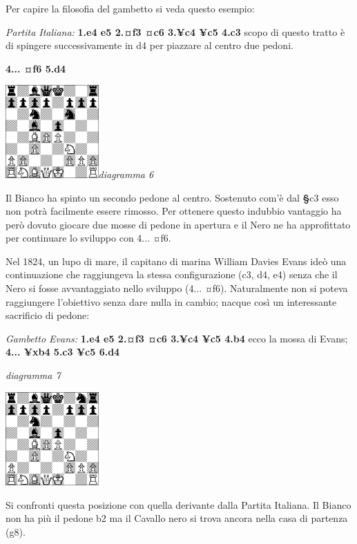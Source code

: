 \documentclass[
]{article}
\begin{document}
Per capire la filosofia del gambetto si veda questo esempio:

\emph{Partita Italiana:} \textbf{1.e4 e5 2.¤f3 ¤c6 3.¥c4 ¥c5 4.c3} scopo
di questo tratto è di spingere successivamente in d4 per piazzare al
centro due pedoni.

\textbf{4... ¤f6 5.d4}

\includegraphics[width=1.40139in,height=1.40139in]{vertopal_109f12be458a423d8f3cc838880eaea2/media/image6.png}\emph{diagramma
6}

Il Bianco ha spinto un secondo pedone al centro. Sostenuto com'è dal
\textbf{§}c3 esso non potrà facilmente essere rimosso. Per ottenere
questo indubbio vantaggio ha però dovuto giocare due mosse di pedone in
apertura e il Nero ne ha approfittato per continuare lo sviluppo con
4... ¤f6.

Nel 1824, un lupo di mare, il capitano di marina William Davies Evans
ideò una continuazione che raggiungeva la stessa configurazione (c3, d4,
e4) senza che il Nero si fosse avvantaggiato nello sviluppo (4... ¤f6).
Naturalmente non si poteva raggiungere l'obiettivo senza dare nulla in
cambio; nacque così un interessante sacrificio di pedone:

\emph{Gambetto Evans:} \textbf{1.e4 e5 2.¤f3 ¤c6 3.¥c4 ¥c5 4.b4} ecco la
mossa di Evans; \textbf{4... ¥xb4 5.c3 ¥c5 6.d4}

\emph{diagramma 7}

\includegraphics[width=1.40972in,height=1.40972in]{vertopal_109f12be458a423d8f3cc838880eaea2/media/image7.png}

Si confronti questa posizione con quella derivante dalla Partita
Italiana. Il Bianco non ha più il pedone b2 ma il Cavallo nero si trova
ancora nella casa di partenza (g8).
\end{document}
